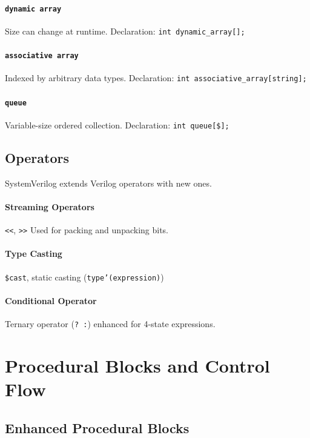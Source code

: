 \paragraph{\texttt{dynamic array}} Size can change at runtime. Declaration: \texttt{int dynamic\_array[];}

\paragraph{\texttt{associative array}} Indexed by arbitrary data types. Declaration: \texttt{int associative\_array[string];}

\paragraph{\texttt{queue}} Variable-size ordered collection. Declaration: \texttt{int queue[\$];}

\subsection{Operators}
SystemVerilog extends Verilog operators with new ones.

\paragraph{\textbf{Streaming Operators}} \texttt{<<}, \texttt{>>} Used for packing and unpacking bits.

\paragraph{\textbf{Type Casting}} \texttt{\$cast}, static casting (\texttt{type'(expression)})

\paragraph{\textbf{Conditional Operator}} Ternary operator (\texttt{? :}) enhanced for 4-state expressions.

\section{Procedural Blocks and Control Flow}

\subsection{Enhanced Procedural Blocks}
